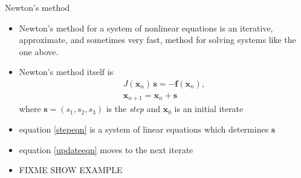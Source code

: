 \documentclass[10pt,hyperref]{beamer}
\newcommand{\bbf}{\mathbf{f}}
\newcommand{\bs}{\mathbf{s}}
\newcommand{\bx}{\mathbf{x}}
\begin{document}
\begin{frame}{Newton's method}
\begin{itemize}
\item Newton's method for a system of nonlinear equations is an iterative, approximate, and sometimes very fast, method for solving systems like the one above.
\item Newton's method itself is
\begin{gather}
J(\bx_n)\, \bs = - \bbf(\bx_n), \label{stepeqn} \\
\bx_{n+1} = \bx_n + \bs \label{updateeqn}
\end{gather}
where $\bs=(s_1,s_2,s_3)$ is the \emph{step} and $\bx_0$ is an initial iterate
\item equation \eqref{stepeqn} is a system of linear equations which determines $\bs$
\item equation \eqref{updateeqn} moves to the next iterate

\item FIXME SHOW EXAMPLE
\end{itemize}
\end{frame}
\end{document}
